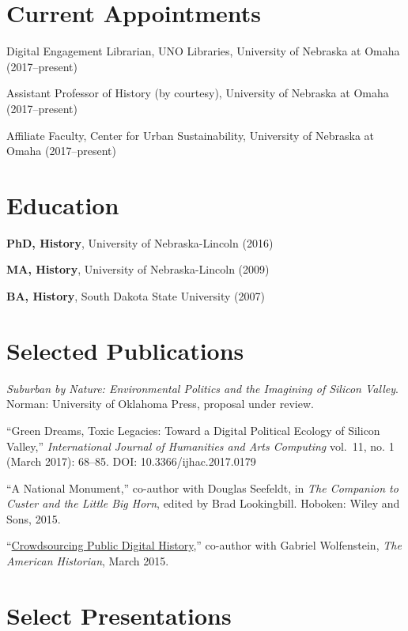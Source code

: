 \section{Current Appointments}\label{current-appointments}

Digital Engagement Librarian, UNO Libraries, University of Nebraska at
Omaha (2017--present)

Assistant Professor of History (by courtesy), University of Nebraska at
Omaha (2017--present)

Affiliate Faculty, Center for Urban Sustainability, University of
Nebraska at Omaha (2017--present)

\section{Education}\label{education}

\textbf{PhD, History}, University of Nebraska-Lincoln (2016)

\textbf{MA, History}, University of Nebraska-Lincoln (2009)

\textbf{BA, History}, South Dakota State University (2007)

\section{Selected Publications}\label{selected-publications}

\emph{Suburban by Nature: Environmental Politics and the Imagining of
Silicon Valley}. Norman: University of Oklahoma Press, proposal under
review.

``Green Dreams, Toxic Legacies: Toward a Digital Political Ecology of
Silicon Valley,'' \emph{International Journal of Humanities and Arts
Computing} vol.~11, no. 1 (March 2017): 68--85. DOI:
10.3366/ijhac.2017.0179

``A National Monument,'' co-author with Douglas Seefeldt, in \emph{The
Companion to Custer and the Little Big Horn}, edited by Brad
Lookingbill. Hoboken: Wiley and Sons, 2015.

``\href{http://tah.oah.org/content/crowdsourcing-digital-public-history/}{Crowdsourcing
Public Digital History},'' co-author with Gabriel Wolfenstein, \emph{The
American Historian}, March 2015.

\section{Select Presentations}\label{select-presentations}

